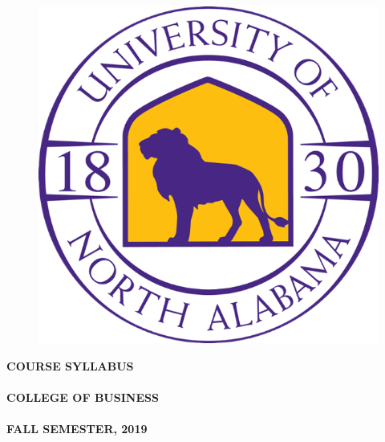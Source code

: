 \documentclass[12pt]{letter}
\newlength{\logowidth}
\newcommand{\customhref}[2]{
	\href{#1}{\color{blue}\burl{#2}}	
}
\newcommand{\semester}{FALL SEMESTER, 2019}
\begin{document}
\thispagestyle{empty}


\begin{large}


\begin{figure}
 \includegraphics[width=\logowidth]{img/approved_una_logo}
\end{figure}

\textbf{COURSE SYLLABUS}\\ \\
\textbf{COLLEGE OF BUSINESS}\\ \\
\textbf{\semester}
 
  \vspace*{28pt}
  \textbf{\course} \\ \\ 
  \textbf{\coursetitle}
\end{large}
\end{document}
